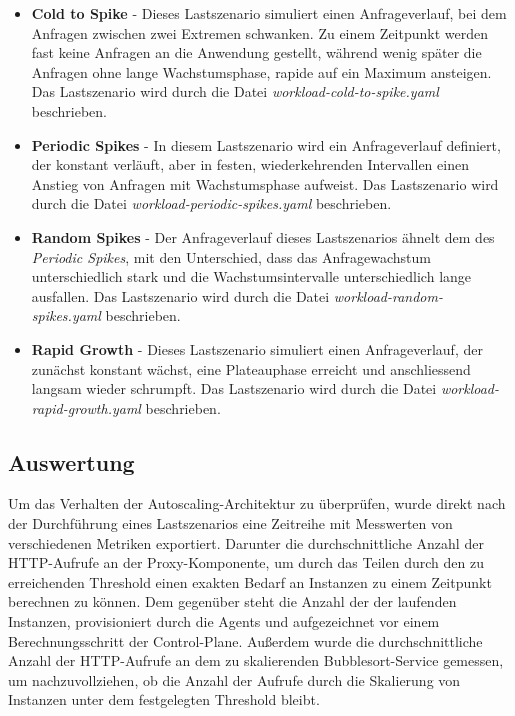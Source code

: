 \documentclass[runningheads]{llncs}
\begin{document}
 \begin{itemize}
 	\item \textbf{Cold to Spike} - Dieses Lastszenario simuliert einen Anfrageverlauf, bei dem Anfragen zwischen zwei Extremen schwanken. Zu einem Zeitpunkt werden fast keine Anfragen an die Anwendung gestellt, während wenig später die Anfragen ohne lange Wachstumsphase, rapide auf ein Maximum ansteigen. Das Lastszenario wird durch die Datei \textit{workload-cold-to-spike.yaml} beschrieben. \\
 	
 	\item \textbf{Periodic Spikes} - In diesem Lastszenario wird ein Anfrageverlauf definiert, der konstant verläuft, aber in festen, wiederkehrenden Intervallen einen Anstieg von Anfragen mit Wachstumsphase aufweist.  Das Lastszenario wird durch die Datei \textit{workload-periodic-spikes.yaml} beschrieben. \\
 	
 	\item \textbf{Random Spikes} - Der Anfrageverlauf dieses Lastszenarios ähnelt dem des \textit{Periodic Spikes}, mit den Unterschied, dass das Anfragewachstum unterschiedlich stark und die Wachstumsintervalle unterschiedlich lange ausfallen.  Das Lastszenario wird durch die Datei \textit{workload-random-spikes.yaml} beschrieben. \\
 	
 	\item \textbf{Rapid Growth} -  Dieses Lastszenario simuliert einen Anfrageverlauf, der zunächst konstant wächst, eine Plateauphase erreicht und anschliessend lang\-sam wieder schrumpft. Das Lastszenario wird durch die Datei \textit{workload-rapid-growth.yaml} beschrieben.
 \end{itemize}

\subsection{Auswertung}

Um das Verhalten der Autoscaling-Architektur zu überprüfen, wurde direkt nach der Durchführung eines Lastszenarios eine Zeitreihe mit Messwerten von verschiedenen Metriken exportiert. Darunter die durchschnittliche Anzahl der HTTP-Aufrufe an der Proxy-Komponente, um durch das Teilen durch den zu erreichenden Threshold einen exakten Bedarf an Instanzen zu einem Zeitpunkt berechnen zu können. Dem gegenüber steht die Anzahl der der laufenden Instanzen, provisioniert durch die Agents und aufgezeichnet vor einem Berechnungsschritt der Control-Plane. Außerdem wurde die durchschnittliche Anzahl der HTTP-Aufrufe an dem zu skalierenden Bubblesort-Service gemessen, um nachzuvollziehen, ob die Anzahl der Aufrufe durch die Skalierung von Instanzen unter dem festgelegten Threshold bleibt.
\end{document}
